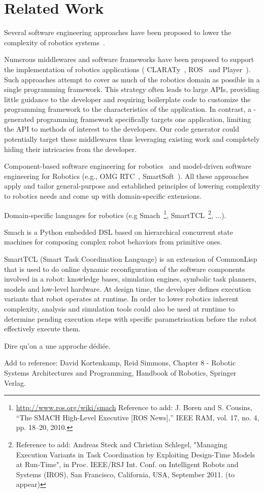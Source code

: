 
\section{Related Work}
\label{sec:related}

Several software engineering approaches have been proposed to lower
the complexity of robotics systems~\cite{Brug07a}.

Numerous middlewares and software frameworks have been proposed to
support the implementation of robotics applications (\eg{}
CLARATy~\cite{Claraty}, ROS~\cite{ROS} and Player~\cite{Coll05a}).
Such approaches attempt to cover as much of the robotics domain as
possible in a single programming framework. This strategy often leads
to large APIs, providing little guidance to the developer and
requiring boilerplate code to customize the programming framework to
the characteristics of the application. In contrast, a
\diaspec{}-generated programming framework specifically targets one
application, limiting the API to methods of interest to the
developers. Our code generator could potentially target these
middlewares thus leveraging existing work and completely hiding their
intricacies from the developer.

Component-based software engineering for robotics~\cite{Brug07b} and
model-driven software engineering for Robotics (e.g., OMG
RTC~\cite{OMGRTC}, SmartSoft~\cite{Schl09a}). All these approaches
apply and tailor general-purpose and established principles of
lowering complexity to robotics needs and come up with domain-specific
extensions.

Domain-specific languages for robotics (e.g Smach~\footnote{\url{http://www.ros.org/wiki/smach} Reference to add: J. Boren and S. Cousins, “The SMACH High-Level Executive [ROS News],” IEEE RAM, vol. 17, no. 4, pp. 18–20, 2010. }, SmartTCL~\footnote{Reference to add: Andreas Steck and Christian Schlegel, "Managing Execution Variants in Task Coordination by Exploiting Design-Time Models at Run-Time", in Proc. IEEE/RSJ Int. Conf. on Intelligent Robots and Systems (IROS), San Francisco, California, USA, September 2011. (to appear)}, ...).

Smach is a Python embedded DSL based on hierarchical concurrent state machines for composing complex robot behaviors from primitive ones.

SmartTCL (Smart Task Coordination Language) is an extension of CommonLisp that is used to do online dynamic reconfiguration of the software components involved in a robot: knowledge bases, simulation engines, symbolic task planners, models and low-level hardware. At design time, the developer defines execution variants that robot operates at runtime. In order to lower robotics inherent complexity, analysis and simulation tools could also be used at runtime to determine pending execution steps with specific parametrisation before the robot effectively execute them.

Dire qu'on a une approche dédiée.

Add to reference: David Kortenkamp, Reid Simmons, Chapter 8 - Robotic Systems Architectures and Programming, Handbook of Robotics, Springer Verlag.
